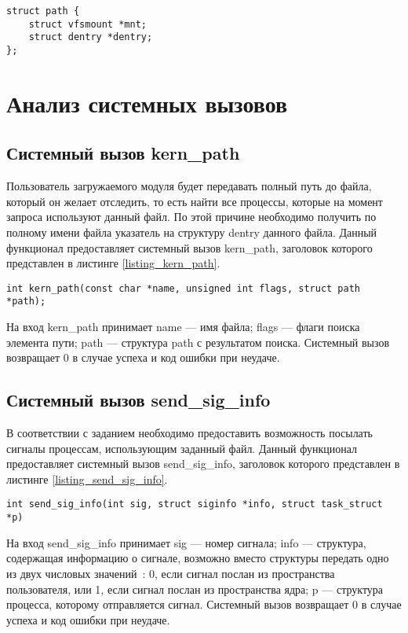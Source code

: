 \pagebreak

\begin{center}
	\begin{lstlisting}[label=listing_path,caption=Структура path]
struct path {
	struct vfsmount *mnt;
	struct dentry *dentry;
};
\end{lstlisting}
\end{center}

\section{Анализ системных вызовов}

\subsection{Системный вызов kern\_path}

Пользователь загружаемого модуля будет передавать полный путь до файла, который он желает отследить, то есть найти все процессы, которые на момент запроса используют данный файл.
По этой причине необходимо получить по полному имени файла указатель на структуру dentry данного файла.
Данный функционал предоставляет системный вызов kern\_path, заголовок которого представлен в листинге \ref{listing_kern_path}.
\begin{center}
	\begin{lstlisting}[label=listing_kern_path,caption=Заголовок системного вызова kern\_path]
int kern_path(const char *name, unsigned int flags, struct path *path);
	\end{lstlisting}
\end{center}
На вход kern\_path принимает name --- имя файла; flags --- флаги поиска элемента пути; path --- структура path с результатом поиска.
Системный вызов возвращает 0 в случае успеха и код ошибки при неудаче.

\subsection{Системный вызов send\_sig\_info}

В соответствии с заданием необходимо предоставить возможность посылать сигналы процессам, использующим заданный файл.
Данный функционал предоставляет системный вызов send\_sig\_info, заголовок которого представлен в листинге \ref{listing_send_sig_info}.
\begin{center}
	\begin{lstlisting}[label=listing_send_sig_info,caption=Заголовок системного вызова send\_sig\_info]
int send_sig_info(int sig, struct siginfo *info, struct task_struct *p)
	\end{lstlisting}
\end{center}
На вход send\_sig\_info принимает sig --- номер сигнала; info --- структура, содержащая информацию о сигнале, возможно вместо структуры передать одно из двух числовых значений~\cite{send_signal}: 0, если сигнал послан из пространства пользователя, или 1, если сигнал послан из пространства ядра; p --- структура процесса, которому отправляется сигнал.
Системный вызов возвращает 0 в случае успеха и код ошибки при неудаче.

